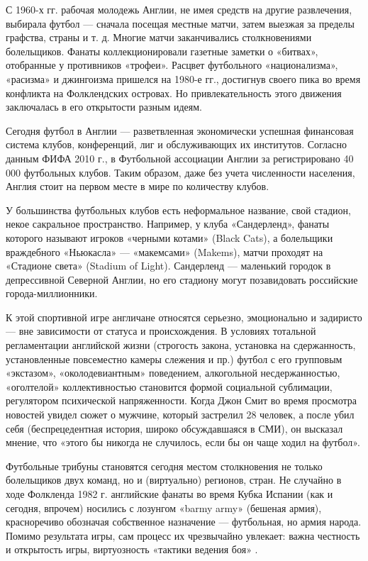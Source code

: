 С 1960-х гг. рабочая молодежь Англии, не имея средств на другие развлечения, выбирала футбол — сначала посещая местные матчи, затем выезжая за пределы графства, страны и т. д. Многие матчи заканчивались столкновениями болельщиков. Фанаты коллекционировали газетные заметки о «битвах», отобранные у противников «трофеи». Расцвет футбольного «национализма», «расизма» и джингоизма пришелся на 1980-е гг., достигнув своего пика во время конфликта на Фолклендских островах. Но привлекательность этого движения заключалась в его открытости разным идеям.

Сегодня футбол в Англии — разветвленная экономически успешная финансовая система клубов, конференций, лиг и обслуживающих их институтов. Согласно данным ФИФА 2010 г., в Футбольной ассоциации Англии за регистрировано 40 000 футбольных клубов. Таким образом, даже без учета численности населения, Англия стоит на первом месте в мире по количеству клубов.

У большинства футбольных клубов есть неформальное название, свой стадион, некое сакральное пространство. Например, у клуба «Сандерленд», фанаты которого называют игроков «черными котами» (Black Cats), а болельщики враждебного «Ньюкасла» — «макемсами» (Makems), матчи проходят на «Стадионе света» (Stadium of Light). Сандерленд — маленький городок в депрессивной Северной Англии, но его стадиону могут позавидовать российские города-миллионники.

К этой спортивной игре англичане относятся серьезно, эмоционально и задиристо — вне зависимости от статуса и происхождения. В условиях тотальной регламентации английской жизни (строгость закона, установка на сдержанность, установленные повсеместно камеры слежения и пр.) футбол с его групповым «экстазом», «околодевиантным» поведением, алкогольной несдержанностью, «оголтелой» коллективностью становится формой социальной сублимации, регулятором психической напряженности. Когда Джон Смит во время просмотра новостей увидел сюжет о мужчине, который застрелил 28 человек, а после убил себя (беспрецедентная история, широко обсуждавшаяся в СМИ), он высказал мнение, что «этого бы никогда не случилось, если бы он чаще ходил на футбол».

Футбольные трибуны становятся сегодня местом столкновения не только болельщиков двух команд, но и (виртуально) регионов, стран. Не случайно в ходе Фолкленда 1982 г. английские фанаты во время Кубка Испании (как и сегодня, впрочем) носились с лозунгом «barmy army» (бешеная армия), красноречиво обозначая собственное назначение — футбольная, но армия народа. Помимо результата игры, сам процесс их чрезвычайно увлекает: важна честность и открытость игры, виртуозность «тактики ведения боя» \cite{football}.



























